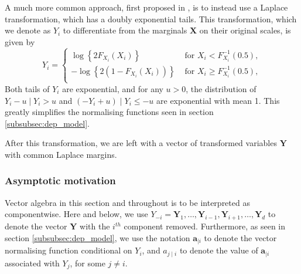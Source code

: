 \documentclass{article}
\numberwithin{equation}{section}
\begin{document}
A much more common approach, first proposed in \citet{Keef2013}, is to instead use a Laplace transformation, which has a doubly exponential tails.
This transformation, which we denote as $Y_i$ to differentiate from the marginals $\bm{X}$ on their original scales, is given by 
\begin{equation} \label{eq:laplace}
  Y_i = \begin{cases}
    \log\left\{2F_{X_i}(X_i)\right\} &\text{ for } X_i < F_{X_i}^{-1}(0.5), \\
    -\log\left\{2(1 - F_{X_i}(X_i))\right\} &\text{ for } X_i \ge F_{X_i}^{-1}(0.5), \\
  \end{cases}
\end{equation}
Both tails of $Y_i$ are exponential, and for any $u > 0$, the distribution of $Y_i - u \mid Y_i > u$ and $(-Y_i + u) \mid Y_i \le -u$ are exponential with mean 1. 
This greatly simplifies the normalising functions seen in section \ref{subsubsec:dep_model}.

After this transformation, we are left with a vector of transformed variables $\bm{Y}$ with common Laplace margins. 

\subsubsection{Asymptotic motivation}

Vector algebra in this section and throughout is to be interpreted as componentwise.
Here and below, we use $Y_{-i} = {\bm{Y}_1, \ldots, \bm{Y}_{i-1}, \bm{Y}_{i+1}, \ldots, \bm{Y}_d}$ to denote the vector $\bm{Y}$ with the $i^{th}$ component removed. 
Furthermore, as seen in section \ref{subsubsec:dep_model}, we use the notation $\bm{a}_{\mid i}$ to denote the vector normalising function conditional on $Y_i$, and $a_{j \mid i}$ to denote the value of $\bm{a}_{\mid i}$ associated with $Y_j$, for some $j \ne i$. 
\end{document}
